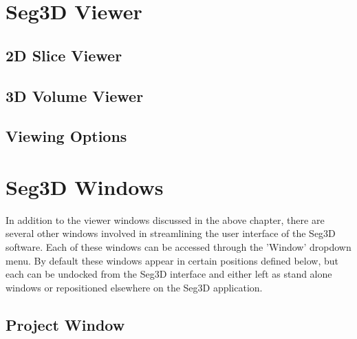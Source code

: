 \documentclass[fleqn,11pt,openany]{book}
\begin{document}
\chapter{Seg3D Viewer}

\begin{introduction}

\end{introduction}

\section{2D Slice Viewer}

\section{3D Volume Viewer}

\section{Viewing Options}

\chapter{Seg3D Windows}

\begin{introduction}
In addition to the viewer windows discussed in the above chapter, there are several other
 windows involved in streamlining the user interface of the Seg3D software.  
 Each of these windows can be accessed through the 'Window' dropdown menu.
 By default these windows appear in certain positions defined below, but each can be undocked
 from the Seg3D interface and either left as stand alone windows or repositioned elsewhere on
 the Seg3D application.
  
\end{introduction}

\section{Project Window}
\end{document}
